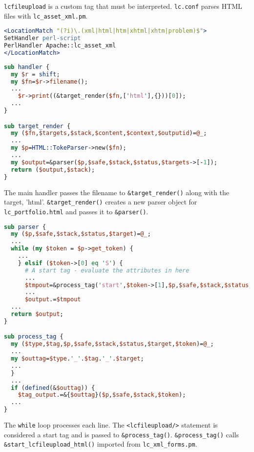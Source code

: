 {\tt lcfileupload} is a custom tag that must be interpreted.  {\tt lc.conf} parses HTML files with {\tt lc\_asset\_xml.pm}.

\begin{lstlisting}[language=apache,frame=single,title=lc.conf]
<LocationMatch "(?i)\.(xml|html|htm|xhtml|xhtm|problem)$">
SetHandler perl-script
PerlHandler Apache::lc_asset_xml
</LocationMatch> 
\end{lstlisting}

\newpage

\begin{lstlisting}[language=Perl,frame=single,title=lc\_asset\_xml.pm]
sub handler {
  my $r = shift;
  my $fn=$r->filename();
  ...
    $r->print((&target_render($fn,['html'],{}))[0]);
  ...
}

sub target_render {
  my ($fn,$targets,$stack,$content,$context,$outputid)=@_;
  ...
  my $p=HTML::TokeParser->new($fn);
  ...
  my $output=&parser($p,$safe,$stack,$status,$targets->[-1]);
  return ($output,$stack);
}
\end{lstlisting}

The main handler passes the filename to {\tt \&target\_render()} along with the target, 'html'.  {\tt \&target\_render()} creates a new parser object for {\tt lc\_portfolio.html} and passes it to {\tt \&parser()}.

\begin{lstlisting}[language=Perl,frame=single,title=lc\_asset\_xml.pm (cont.)]
sub parser {
  my ($p,$safe,$stack,$status,$target)=@_;
  ...
  while (my $token = $p->get_token) {
    ...
    } elsif ($token->[0] eq 'S') {
      # A start tag - evaluate the attributes in here
      ...
      $tmpout=&process_tag('start',$token->[1],$p,$safe,$stack,$status,$target,$token);
      ...
      $output.=$tmpout
  ...
  return $output;
}

sub process_tag {
  my ($type,$tag,$p,$safe,$stack,$status,$target,$token)=@_;
  ...
  my $outtag=$type.'_'.$tag.'_'.$target;
  ...
  }
  ...
  if (defined(&$outtag)) {
    $tag_output.=&{$outtag}($p,$safe,$stack,$token);
  ...
}
\end{lstlisting}

The {\tt while} loop processes each line. The {\tt <lcfileupload/>} statement is considered a start tag and is passed to {\tt \&process\_tag()}.  {\tt \&process\_tag()} calls {\tt \&start\_lcfileupload\_html()} imported from {\tt lc\_xml\_forms.pm}.

